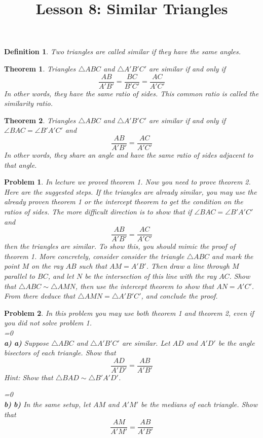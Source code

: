 \documentclass[a4paper,12pt]{article}
\title{Lesson 8: Similar Triangles}
\theoremstyle{perfect}
\newtheorem{thm}{Theorem}
\newtheorem{dfn}{Definition}
\newtheorem{prb}{Problem}
\newcommand{\varline}{0}
\renewcommand\part[1]{
\ifnum\pdfstrcmp{\varline}{1}=0
    \vspace{.10in}\textbf{\\#1)}
  \else
    \textbf{#1)}
  \fi\renewcommand{\varline}{1}}
\begin{document}
 
\maketitle

\begin{dfn}
Two triangles are called \textit{similar} if they have the same angles.  
\end{dfn}

\begin{thm}
Triangles $\triangle ABC$ and $\triangle A'B'C'$ are similar if and only if $$\frac{AB}{A'B'} = \frac{BC}{B'C'} = \frac{AC}{A'C'}$$
In other words, they have the same ratio of sides. This common ratio is called the \textit{similarity ratio}.
\end{thm}
\begin{thm}
Triangles $\triangle ABC$ and $\triangle A'B'C'$ are similar if and only if $\angle BAC = \angle B'A'C'$ and $$\frac{AB}{A'B'} = \frac{AC}{A'C'}$$
In other words, they share an angle and have the same ratio of sides adjacent to that angle.
\end{thm}
\begin{prb}
In lecture we proved theorem 1. Now you need to prove theorem 2. Here are the suggested steps. If the triangles are already similar, you may use the already proven theorem 1 or the intercept theorem to get the condition on the ratios of sides. The more difficult direction is to show that if $\angle BAC = \angle B'A'C'$ and $$\frac{AB}{A'B'} = \frac{AC}{A'C'}$$ then the triangles are similar. To show this, you should mimic the proof of theorem 1. More concretely, consider consider the triangle $\triangle ABC$ and mark the point $M$ on the ray $AB$ such that $AM = A'B'$. Then draw a line through $M$ parallel to $BC$, and let $N$ be the intersection of this line with the ray $AC$. Show that $\triangle ABC \sim \triangle AMN$, then use the intercept theorem to show that $AN = A'C'$. From there deduce that $\triangle AMN = \triangle A'B'C'$, and conclude the proof.
\end{prb}

\begin{prb}
In this problem you may use both theorem 1 and theorem 2, even if you did not solve problem 1.\\
\part{a} Suppose $\triangle ABC$ and $\triangle A'B'C'$ are similar. Let $AD$ and $A'D'$ be the angle bisectors of each triangle. Show that $$\frac{AD}{A'D'} = \frac{AB}{A'B'}$$
\textit{Hint: Show that $\triangle BAD \sim \triangle B'A'D'$.}
\part{b} In the same setup, let $AM$ and $A'M'$ be the medians of each triangle. Show that $$\frac{AM}{A'M'} = \frac{AB}{A'B'}$$
\end{prb}
\end{document}
